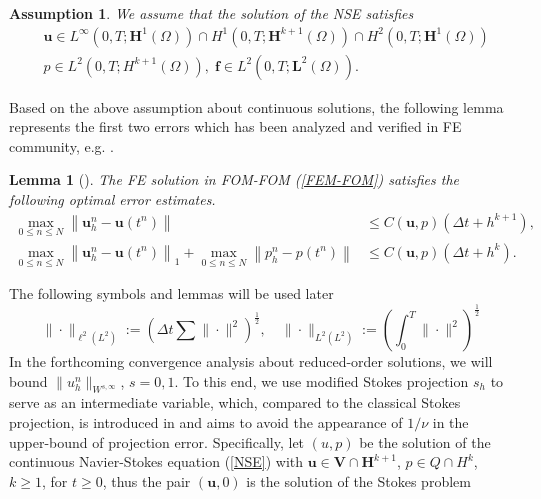 \documentclass[10pt,twoside,openany,UTF8,CJK]{article}
\newtheorem{Lemma}{Lemma}[section]
\newtheorem{Assumption}{Assumption}[section]
\begin{document}
    \begin{Assumption}
    	We assume that the solution of the NSE satisfies
    	$$
    	\begin{aligned}
    		& \boldsymbol{u} \in L^{\infty}\left(0, T ; \boldsymbol{H}^1(\Omega)\right) \cap H^1\left(0, T ; \boldsymbol{H}^{k+1}(\Omega)\right) \cap H^2\left(0, T ; \boldsymbol{H}^1(\Omega)\right) \\
    		& p \in L^2\left(0, T ; H^{k+1}(\Omega)\right), \; \boldsymbol{f} \in L^2\left(0, T ; \boldsymbol{L}^2(\Omega)\right) .
    	\end{aligned}
        $$
    \end{Assumption}
    Based on the above assumption about continuous solutions, the following lemma represents the first two errors which has been analyzed and verified in FE community, e.g. \cite{Proj-Guermond-1998-IJNMF}.
    \begin{Lemma}[\!\!\cite{Proj-Guermond-1998-IJNMF}]\label{Conv-Exact-FE}
    	The FE solution in FOM-FOM (\ref{FEM-FOM}) satisfies the following optimal error estimates.
    	\begin{equation}
    	\begin{aligned}
    		\max _{0 \leq n \leq N}\left\|\boldsymbol{u}_h^n-\boldsymbol{u}\left(t^n\right)\right\| &\leq C(\boldsymbol{u}, p)\left(\Delta t+h^{k+1}\right), \\
    		\max _{0 \leq n \leq N}\left\|\boldsymbol{u}_h^n-\boldsymbol{u}\left(t^n\right)\right\|_1 + \max _{0 \leq n \leq N}\left\|p_h^n-p\left(t^n\right)\right\| &\leq C(\boldsymbol{u}, p)\left(\Delta t+h^{k}\right).
    	\end{aligned}
        \end{equation}
    \end{Lemma}
    \indent The following symbols and lemmas will be used later
    $$
    \|\cdot\|_{\ell^2(L^2)} := \left(\Delta t\sum\|\cdot\|^2\right)^{\frac12}, \quad \|\cdot\|_{L^2(L^2)} := \left(\int^{T}_{0}\|\cdot\|^2\right)^{\frac12}
    $$
	\indent In the forthcoming convergence analysis about reduced-order solutions, we will bound $\|u^n_h\|_{W^{s,\infty}}$, $s=0,1$. To this end, we use modified Stokes projection $s_h$ to serve as an intermediate variable, which, compared to the classical Stokes projection\cite{Heywood-Rannacher-1982-SINUM-3}, is introduced in \cite{Frutos-ModifiedStokesProj-2016-JSC} and aims to avoid the appearance of $1/\nu$ in the upper-bound of projection error. Specifically, let $(u,p)$ be the solution of the continuous Navier-Stokes equation (\ref{NSE}) with $\boldsymbol{u}\in \boldsymbol{V}\cap \boldsymbol{H}^{k+1}$, $p\in Q\cap H^{k}$, $k\geq 1$, for $t\geq 0$, thus the pair $(\boldsymbol{u},0)$ is the solution of the Stokes problem
\end{document}
